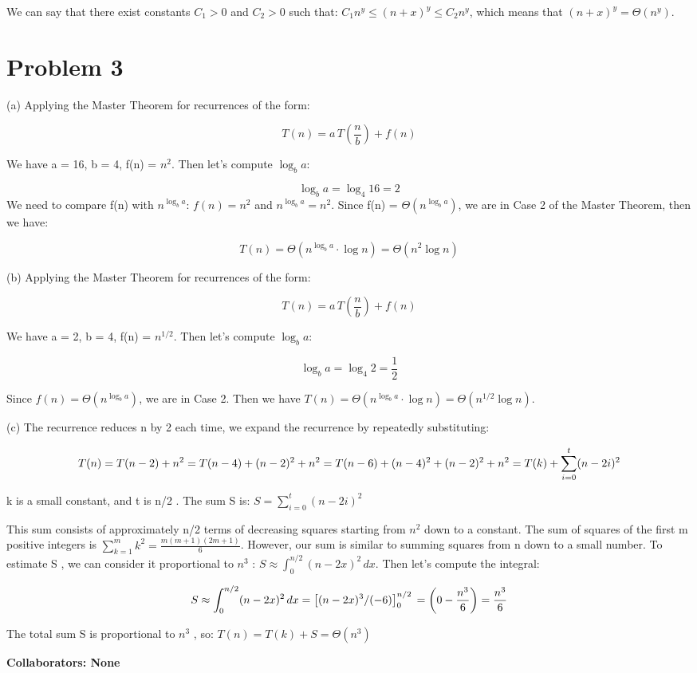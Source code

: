 \documentclass[12 pt]{article}
\begin{document}
We can say that there exist constants $C_1 > 0$ and $C_2 > 0$ such that: $C_1 n^y \leq (n + x)^y \leq C_2 n^y$, which means that
$(n + x)^y = \Theta(n^y)$.

\vspace{1cm}

\section*{Problem 3}
(a) Applying the Master Theorem for recurrences of the form:

\[
T(n) = a\, T\left( \dfrac{n}{b} \right) + f(n)
\]

We have a = 16, b = 4, f(n) = $n^2$. Then let's compute $\log_b a$:

\[
\log_b a = \log_4 16 = 2
\]
We need to compare f(n) with $n^{\log_b a}$: $f(n) = n^2$ and $n^{\log_b a} = n^{2}$. Since f(n) = $\Theta\left( n^{\log_b a} \right)$, we are in Case 2 of the Master Theorem, then we have:

\[
T(n) = \Theta\left( n^{\log_b a} \cdot \log n \right) = \Theta\left( n^2 \log n \right)
\]

(b) Applying the Master Theorem for recurrences of the form:

\[
T(n) = a\, T\left( \dfrac{n}{b} \right) + f(n)
\]

We have a = 2, b = 4, f(n) = $n^{1/2}$. Then let's compute $\log_b a$:

\[
\log_b a = \log_4 2 = \dfrac{1}{2}
\]

Since $f(n) = \Theta\left( n^{\log_b a} \right)$, we are in Case 2. Then we have $T(n) = \Theta\left( n^{\log_b a} \cdot \log n \right) = \Theta\left( n^{1/2} \log n \right)$.


(c) The recurrence reduces  n  by 2 each time, we expand the recurrence by repeatedly substituting:

\[
T(n) = T(n - 2) + n^2 \\
= T(n - 4) + (n - 2)^2 + n^2 \\
= T(n - 6) + (n - 4)^2 + (n - 2)^2 + n^2 \\
= T(k) + \sum_{i=0}^{t} (n - 2i)^2
\]

k  is a small constant, and  t  is  n/2 . The sum  S  is: $S = \sum_{i=0}^{t} (n - 2i)^2$

This sum consists of approximately  n/2  terms of decreasing squares starting from  $n^2$  down to a constant. The sum of squares of the first  m  positive integers is  $\sum_{k=1}^{m} k^2 = \frac{m(m + 1)(2m + 1)}{6}$. However, our sum is similar to summing squares from  n  down to a small number. To estimate  S , we can consider it proportional to  $n^3$ : $S \approx \int_{0}^{n/2} (n - 2x)^2 \, dx$. Then let's compute the integral:

\[
S \approx \int_{0}^{n/2} (n - 2x)^2 \, dx \\
= \left[ (n - 2x)^3 / (-6) \right]_0^{n/2} \\
= \left( 0 - \frac{n^3}{6} \right) = \frac{n^3}{6}
\]

The total sum  S  is proportional to  $n^3$ , so: $T(n) = T(k) + S = \Theta(n^3)$



\vspace{1cm}

\noindent\textbf{Collaborators: None}
\end{document}
